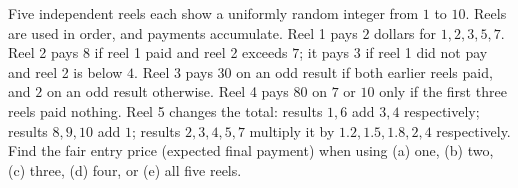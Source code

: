 Five independent reels each show a uniformly random integer from $1$ to $10$. Reels are used in order, and payments accumulate. Reel 1 pays $2$ dollars for $1,2,3,5,7$. Reel 2 pays $8$ if reel 1 paid and reel 2 exceeds $7$; it pays $3$ if reel 1 did not pay and reel 2 is below $4$. Reel 3 pays $30$ on an odd result if both earlier reels paid, and $2$ on an odd result otherwise. Reel 4 pays $80$ on $7$ or $10$ only if the first three reels paid nothing. Reel 5 changes the total: results $1,6$ add $3,4$ respectively; results $8,9,10$ add $1$; results $2,3,4,5,7$ multiply it by $1.2,1.5,1.8,2,4$ respectively. Find the fair entry price (expected final payment) when using (a) one, (b) two, (c) three, (d) four, or (e) all five reels.
